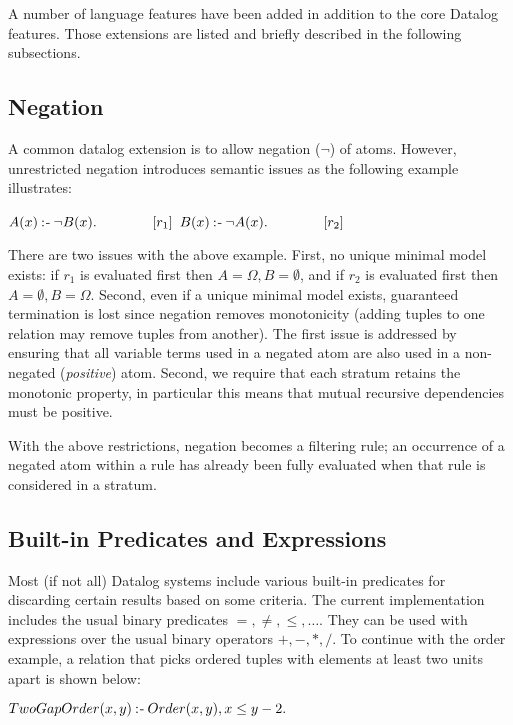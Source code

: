 A number of language features have been added in addition to the core Datalog features. Those extensions are listed and briefly described in the following subsections.
\vspace*{-5 pt}
\subsection{Negation}
A common datalog extension is to allow negation ($\neg$) of atoms. However, unrestricted negation introduces semantic issues as the following example illustrates:

\NL
{\centering
	$A(x) \mathbin{:\hspace{-0.5ex}\textsf{-}} \neg B(x).\qquad\qquad[r_1]$ \NL
	$B(x) \mathbin{:\hspace{-0.5ex}\textsf{-}} \neg A(x).\qquad\qquad[r_2]$\par
}

\NL
There are two issues with the above example. First, no unique minimal model exists: if $r_1$ is evaluated first then $A = \Omega, B = \emptyset$, and if $r_2$ is evaluated first then $A = \emptyset, B = \Omega$. Second, even if a unique minimal model exists, guaranteed termination is lost since negation removes monotonicity (adding tuples to one relation may remove tuples from another). The first issue is addressed by ensuring that all variable terms used in a negated atom are also used in a non-negated (\textit{positive}) atom. Second, we require that each stratum retains the monotonic property, in particular this means that mutual recursive dependencies must be positive.

With the above restrictions, negation becomes a filtering rule; an occurrence of a negated atom within a rule has already been fully evaluated when that rule is considered in a stratum. 

\subsection{Built-in Predicates and Expressions}
Most (if not all) Datalog systems include various built-in predicates for discarding certain results based on some criteria. The current implementation includes the usual binary predicates $=, \neq, \leq, \ldots$. They can be used with expressions over the usual binary operators $+,-,*,/$. To continue with the order example, a relation that picks ordered tuples with elements at least two units apart is shown below:

\NL
{\centering
	$TwoGapOrder(x, y) \mathbin{:\hspace{-0.5ex}\textsf{-}} Order(x, y), x \leq y - 2.$ \NL
}

\vspace*{-\baselineskip}
